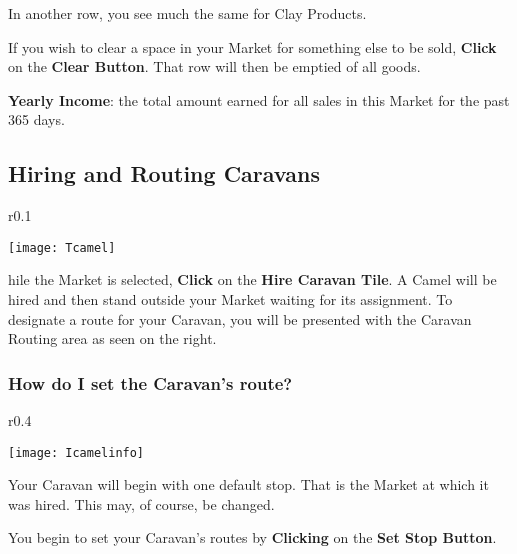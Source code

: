 In another row, you see much the same for Clay Products.

If you wish to clear a space in your Market for something else to be sold, \textbf{Click} on the \textbf{Clear Button}. That row will then be emptied of all goods.

\textbf{Yearly Income}: the total amount earned for all sales in this Market for the past 365 days.

\subsection{\textsf{Hiring and Routing Caravans}}

\begin{wrapfigure}{r}{0.1\textwidth}
    \vspace{-20pt}
    \begin{center}
        \texttt{[image: Tcamel]} %
    \end{center}
    \vspace{-20pt}
\end{wrapfigure}


hile the Market is selected, \textbf{Click} on the \textbf{Hire Caravan Tile}. A Camel will be hired and then stand outside your Market waiting for its assignment. To designate a route for your Caravan, you will be presented with the Caravan Routing area as seen on the right.

\subsubsection{\textsf{How do I set the Caravan’s route?}}

\begin{wrapfigure}{r}{0.4\textwidth}
    \vspace{-20pt}
    \begin{center}
        \texttt{[image: Icamelinfo]} %
    \end{center}
    \vspace{-20pt}
\end{wrapfigure}

Your Caravan will begin with one default stop. That is the Market at which it was hired. This may, of course, be changed.

You begin to set your Caravan’s routes by \textbf{Clicking} on the \textbf{Set Stop Button}.

